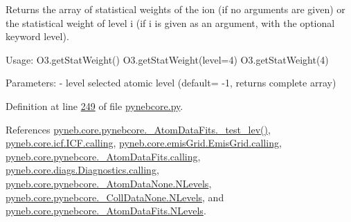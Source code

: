\begin{DoxyVerb}Returns the array of statistical weights of the ion (if no arguments are given) 
    or the statistical weight of level i (if i is given as an argument, 
    with the optional keyword level).
    
Usage:
    O3.getStatWeight()
    O3.getStatWeight(level=4)
    O3.getStatWeight(4)
      
Parameters:
    - level  selected atomic level (default= -1, returns complete array)\end{DoxyVerb}
 

Definition at line \hyperlink{pynebcore_8py_source_l00249}{249} of file \hyperlink{pynebcore_8py_source}{pynebcore.\-py}.



References \hyperlink{pynebcore_8py_source_l00178}{pyneb.\-core.\-pynebcore.\-\_\-\-Atom\-Data\-Fits.\-\_\-test\-\_\-lev()}, \hyperlink{icf_8py_source_l00016}{pyneb.\-core.\-icf.\-I\-C\-F.\-calling}, \hyperlink{emis_grid_8py_source_l00044}{pyneb.\-core.\-emis\-Grid.\-Emis\-Grid.\-calling}, \hyperlink{pynebcore_8py_source_l00097}{pyneb.\-core.\-pynebcore.\-\_\-\-Atom\-Data\-Fits.\-calling}, \hyperlink{diags_8py_source_l00169}{pyneb.\-core.\-diags.\-Diagnostics.\-calling}, \hyperlink{pynebcore_8py_source_l00069}{pyneb.\-core.\-pynebcore.\-\_\-\-Atom\-Data\-None.\-N\-Levels}, \hyperlink{pynebcore_8py_source_l00082}{pyneb.\-core.\-pynebcore.\-\_\-\-Coll\-Data\-None.\-N\-Levels}, and \hyperlink{pynebcore_8py_source_l00098}{pyneb.\-core.\-pynebcore.\-\_\-\-Atom\-Data\-Fits.\-N\-Levels}.


